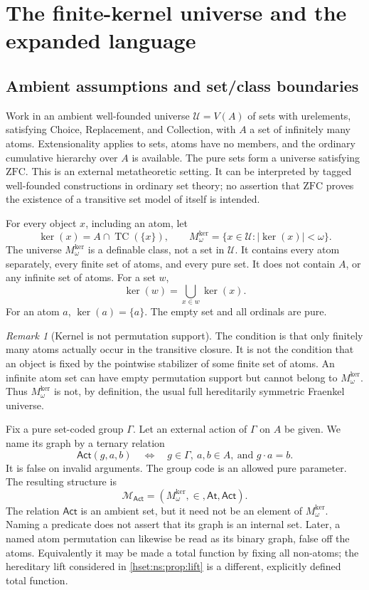 \documentclass[11pt,letterpaper]{article}
\theoremstyle{definition}
\theoremstyle{remark}
\newtheorem{remark}[remark]{Remark}\aliascntresetthe{remark}
\newcommand{\TC}{\operatorname{TC}}
\newcommand{\ZFC}{\mathrm{ZFC}}
\newcommand{\kerat}{\operatorname{ker}}
\newcommand{\Mker}{M^{\mathrm{ker}}}
\newcommand{\Uk}{\mathcal U}
\newcommand{\At}{\mathsf{At}}
\newcommand{\Act}{\mathsf{Act}}
\newcommand{\MAct}{\mathcal M_{\Act}}
\newcommand{\abs}[1]{\lvert #1\rvert}
\begin{document}
\section{The finite-kernel universe and the expanded language}
\label{hset:ns:sec:setup}

\subsection{Ambient assumptions and set/class boundaries}
Work in an ambient well-founded universe $\Uk=V(A)$ of sets with urelements, satisfying Choice, Replacement, and Collection, with $A$ a set of infinitely many atoms. Extensionality applies to sets, atoms have no members, and the ordinary cumulative hierarchy over $A$ is available. The pure sets form a universe satisfying $\ZFC$. This is an external metatheoretic setting. It can be interpreted by tagged well-founded constructions in ordinary set theory; no assertion that $\ZFC$ proves the existence of a transitive set model of itself is intended.

For every object $x$, including an atom, let
\[
 \kerat(x)=A\cap\TC(\{x\}),\qquad
 \Mker_\omega=\{x\in \Uk:\abs{\kerat(x)}<\omega\}.
\]
The universe $\Mker_\omega$ is a definable class, not a set in $\Uk$. It contains every atom separately, every finite set of atoms, and every pure set. It does not contain $A$, or any infinite set of atoms. For a set $w$,
\begin{equation}\label{hset:ns:eq:kernelunion}
 \kerat(w)=\bigcup_{x\in w}\kerat(x).
\end{equation}
For an atom $a$, $\kerat(a)=\{a\}$. The empty set and all ordinals are pure.

\begin{remark}[Kernel is not permutation support]\label{hset:ns:rem:support}
The condition is that only finitely many atoms actually occur in the transitive closure. It is not the condition that an object is fixed by the pointwise stabilizer of some finite set of atoms. An infinite atom set can have empty permutation support but cannot belong to $\Mker_\omega$. Thus $\Mker_\omega$ is not, by definition, the usual full hereditarily symmetric Fraenkel universe.
\end{remark}

Fix a pure set-coded group $\Gamma$. Let an external action of $\Gamma$ on $A$ be given. We name its graph by a ternary relation
\[
 \Act(g,a,b)\quad\Longleftrightarrow\quad
 g\in\Gamma,\ a,b\in A,\ \text{and }g\cdot a=b.
\]
It is false on invalid arguments. The group code is an allowed pure parameter. The resulting structure is
\[
 \MAct=(\Mker_\omega,\in,\At,\Act).
\]
The relation $\Act$ is an ambient set, but it need not be an element of $\Mker_\omega$. Naming a predicate does not assert that its graph is an internal set. Later, a named atom permutation can likewise be read as its binary graph, false off the atoms. Equivalently it may be made a total function by fixing all non-atoms; the hereditary lift considered in \cref{hset:ns:prop:lift} is a different, explicitly defined total function.
\end{document}
